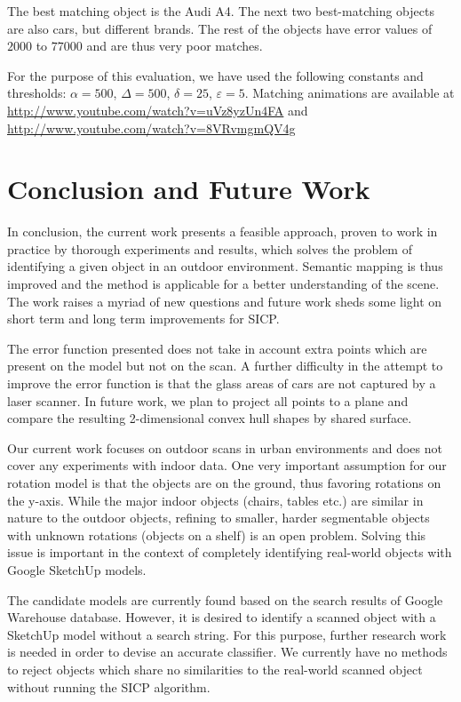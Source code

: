\documentclass{llncs}
\renewcommand{\epsilon}{\varepsilon}
\begin{document}
The best matching object is the Audi A4. The next two best-matching
objects are also cars, but different brands. The rest of the objects
have error values of $2000$ to $77000$ and are thus very poor matches.

For the purpose of this evaluation, we have used the following constants and thresholds: $\alpha=500$, $\Delta=500$, $\delta=25$, $\epsilon=5$. Matching animations are available at 
\url{http://www.youtube.com/watch?v=uVz8yzUn4FA} and
\url{http://www.youtube.com/watch?v=8VRvmgmQV4g}

\section{Conclusion and Future Work}

In conclusion, the current work presents a feasible approach, proven
to work in practice by thorough experiments and results, which solves
the problem of identifying a given object in an outdoor
environment. Semantic mapping is thus improved and the method is
applicable for a better understanding of the scene. The work raises a
myriad of new questions and future work sheds some light on short term
and long term improvements for SICP.

The error function presented does not take in account extra points
which are present on the model but not on the scan. A further
difficulty in the attempt to improve the error function is that the
glass areas of cars are not captured by a laser scanner. In future
work, we plan to project all points to a plane and compare the
resulting 2-dimensional convex hull shapes by shared surface.

Our current work focuses on outdoor scans in urban environments and
does not cover any experiments with indoor data. One very important
assumption for our rotation model is that the objects are on the
ground, thus favoring rotations on the y-axis. While the major indoor
objects (chairs, tables etc.) are similar in nature to the outdoor
objects, refining to smaller, harder segmentable objects with unknown
rotations (objects on a shelf) is an open problem. Solving this issue
is important in the context of completely identifying real-world
objects with Google SketchUp models.

The candidate models are currently found based on the search results
of Google Warehouse database. However, it is desired to identify a
scanned object with a SketchUp model without a search string. For this
purpose, further research work is needed in order to devise an
accurate classifier. We currently have no methods to reject objects
which share no similarities to the real-world scanned object without
running the SICP algorithm.
\end{document}
